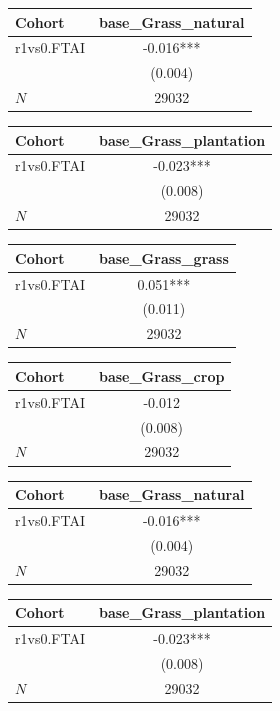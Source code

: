 {
\def\sym#1{\ifmmode^{#1}\else\(^{#1}\)\fi}
\begin{tabular}{l*{1}{c}}
\toprule
Cohort    &base\_Grass\_natural   \\
\midrule
r1vs0.FTAI&   -0.016***\\
          &  (0.004)   \\
\midrule
\(N\)     &    29032   \\
\bottomrule
\end{tabular}
}
{
\def\sym#1{\ifmmode^{#1}\else\(^{#1}\)\fi}
\begin{tabular}{l*{1}{c}}
\toprule
Cohort    &base\_Grass\_plantation   \\
\midrule
r1vs0.FTAI&   -0.023***\\
          &  (0.008)   \\
\midrule
\(N\)     &    29032   \\
\bottomrule
\end{tabular}
}
{
\def\sym#1{\ifmmode^{#1}\else\(^{#1}\)\fi}
\begin{tabular}{l*{1}{c}}
\toprule
Cohort    &base\_Grass\_grass   \\
\midrule
r1vs0.FTAI&    0.051***\\
          &  (0.011)   \\
\midrule
\(N\)     &    29032   \\
\bottomrule
\end{tabular}
}
{
\def\sym#1{\ifmmode^{#1}\else\(^{#1}\)\fi}
\begin{tabular}{l*{1}{c}}
\toprule
Cohort    &base\_Grass\_crop   \\
\midrule
r1vs0.FTAI&   -0.012   \\
          &  (0.008)   \\
\midrule
\(N\)     &    29032   \\
\bottomrule
\end{tabular}
}
{
\def\sym#1{\ifmmode^{#1}\else\(^{#1}\)\fi}
\begin{tabular}{l*{1}{c}}
\toprule
Cohort    &base\_Grass\_natural   \\
\midrule
r1vs0.FTAI&   -0.016***\\
          &  (0.004)   \\
\midrule
\(N\)     &    29032   \\
\bottomrule
\end{tabular}
}
{
\def\sym#1{\ifmmode^{#1}\else\(^{#1}\)\fi}
\begin{tabular}{l*{1}{c}}
\toprule
Cohort    &base\_Grass\_plantation   \\
\midrule
r1vs0.FTAI&   -0.023***\\
          &  (0.008)   \\
\midrule
\(N\)     &    29032   \\
\bottomrule
\end{tabular}
}
